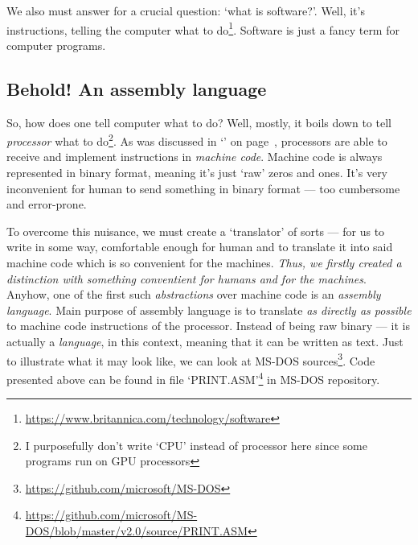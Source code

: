 \documentclass[../../why-computer.tex]{subfiles}
\begin{document}
        We also must answer for a crucial question: `what is software?'. Well, it's instructions, telling the computer what to do\footnote{\href{https://www.britannica.com/technology/software}
        {https://www.britannica.com/technology/software}}. Software is just a fancy term for computer programs. \par

        \subsection{Behold! An assembly language}\label{subsection:behold-assembly-language}

        So, how does one tell computer what to do? Well, mostly, it boils down to tell \emph{processor} what to do\footnote{I purposefully don't write `CPU' instead of processor 
        here since some programs run on GPU processors}. As was discussed in `' on page~\pageref{section:modern-computers}, processors are able 
        to receive and implement instructions in \emph{machine code}. Machine code is always represented in binary format, meaning it's just `raw' zeros and ones. It's very
        inconvenient for human to send something in binary format --- too cumbersome and error-prone. \par

        To overcome this nuisance, we must create a `translator' of sorts --- for us to write in some way, comfortable enough for human and to translate it into said machine code
        which is so convenient for the machines. \emph{Thus, we firstly created a distinction with something conventient for humans and for the machines}. Anyhow, one of the first
        such \emph{abstractions} over machine code is an \emph{assembly language}. Main purpose of assembly language is to translate \emph{as directly as possible} to machine code 
        instructions of the processor. Instead of being raw binary --- it is actually a \emph{language}, in this context, meaning that it can be written as text. Just to illustrate
        what it may look like, we can look at MS-DOS sources\footnote{\href{https://github.com/microsoft/MS-DOS}{https://github.com/microsoft/MS-DOS}}. Code presented above can be found in file `PRINT.ASM'\footnote{\href{https://github.com/microsoft/MS-DOS/blob/master/v2.0/source/PRINT.ASM}
        {https://github.com/microsoft/MS-DOS/blob/master/v2.0/source/PRINT.ASM}} in MS-DOS repository. \par
\end{document}

